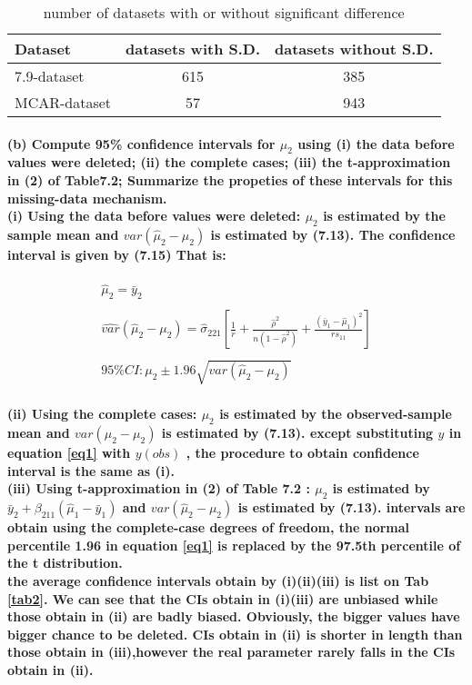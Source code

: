 \documentclass[a4paper]{article}
\newcommand{\yahei}{\CJKfamily{yahei}}
\begin{document}
\begin{table}[!htb]
\fontsize{10pt}{14pt}\selectfont\yahei
\centering
	\begin{tabular}{|l|c|c|}\hline
		Dataset & datasets with S.D. & datasets without S.D. \\	\hline
		7.9-dataset & 615 & 385 \\	\hline
		MCAR-dataset & 57 & 943\\	\hline
	\end{tabular}
	\caption{number of datasets with or without significant difference}
	\label{tab1}
\end{table}

\paragraph{\fontsize{10pt}{14pt}\selectfont\yahei
(b) Compute 95\% confidence intervals for $\mu_2$ using (i) the data before values were deleted; (ii) the complete cases; (iii) the t-approximation in (2) of Table7.2; Summarize the propeties of these intervals for this missing-data mechanism.\\
(i) Using the data before values were deleted: $\mu_2$ is estimated by the sample mean and $var(\hat{\mu}_2-\mu_2)$ is estimated by (7.13). The confidence interval is given by (7.15) That is:}

\begin{equation}
\begin{array}{ccccc}
\hat{\mu}_2 = \bar{y}_2 \\
\\
\hat{var}(\hat{\mu}_2-\mu_2) = \hat{\sigma}_{221}[\frac{1}{r}+\frac{\hat{\rho}^2}{n(1-\hat{\rho}^2)}+\frac{(\bar{y}_1-\hat{\mu}_1)^2}{rs_{11}}]\\
\\
95\% CI: \mu_2 \pm 1.96 \sqrt{var(\hat{\mu}_2-\mu_2)}
\end{array}
\label{eq1}
\end{equation}

\paragraph{\fontsize{10pt}{14pt}\selectfont\yahei
(ii) Using the complete cases: $\mu_2$ is estimated by the observed-sample mean and $var(\hat{\mu}_2-\mu_2)$ is estimated by (7.13). except substituting $y$ in equation \ref{eq1} with $y(obs)$ , the procedure to obtain confidence interval is the same as (i).\\
(iii) Using t-approximation in (2) of Table 7.2 : $\mu_2$ is estimated by $\bar{y}_2 + \beta_{211}(\hat{\mu}_1-\bar{y}_1)$ and $var(\hat{\mu}_2-\mu_2)$ is estimated by (7.13). intervals are obtain using the complete-case degrees of freedom, the normal percentile 1.96 in equation \ref{eq1} is replaced by the 97.5th percentile of the t distribution.\\
the average confidence intervals obtain by (i)(ii)(iii) is list on Tab \ref{tab2}. We can see that the CIs obtain in (i)(iii) are unbiased while those obtain in (ii) are badly biased. Obviously, the bigger values have bigger chance to be deleted. CIs obtain in (ii) is shorter in length than those obtain in (iii),however the real parameter rarely falls in the CIs obtain in (ii).
}
\end{document}
